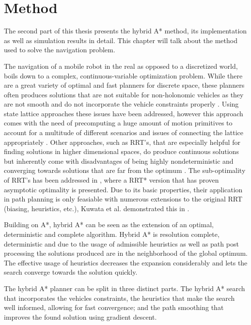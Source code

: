 \chapter{Method}
The second part of this thesis presents the hybrid A* method, its implementation as well as simulation results in detail. This chapter will talk about the method used to solve the navigation problem.

The navigation of a mobile robot in the real as opposed to a discretized world, boils down to a complex, continuous-variable optimization problem. While there are a great variety of optimal and fast planners for discrete space, these planners often produces solutions that are not suitable for non-holonomic vehicles as they are not smooth and do not incorporate the vehicle constraints properly \cite{Dolgov.2008}. Using state lattice approaches these issues have been addressed, however this approach comes with the need of precomputing a huge amount of motion primitives to account for a multitude of different scenarios and issues of connecting the lattice appropriately \cite{Urmson.2008,Ferguson.2008b,Ferguson.2008}.
Other approaches, such as RRT's, that are especially helpful for finding solutions in higher dimensional spaces, do produce continuous solutions but inherently come with disadvantages of being highly nondeterministic and converging towards solutions that are far from the optimum \cite{Karaman.2011}. The sub-optimality of RRT's has been addressed in \cite{Karaman.2011}, where a RRT* version that has proven asymptotic optimality is presented. Due to its basic properties, their application in path planning is only feasiable with numerous extensions to the original RRT (biasing, heuristics, etc.), Kuwata et al. demonstrated this in \cite{Kuwata.2008}.

Building on A*, hybrid A* can be seen as the extension of an optimal, deterministic and complete algorithm. Hybrid A* is resolution complete, deterministic and due to the usage of admissible heuristics as well as path post processing the solutions produced are in the neighborhood of the global optimum. The effective usage of heuristics decreases the expansion considerably and lets the search converge towards the solution quickly.

The hybrid A* planner can be split in three distinct parts. The hybrid A* search that incorporates the vehicles constraints, the heuristics that make the search well informed, allowing for fast convergence; and the path smoothing that improves the found solution using gradient descent.




